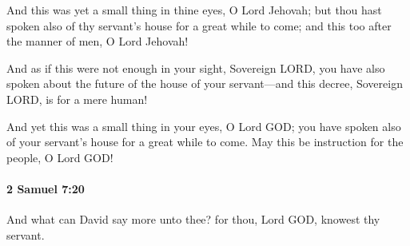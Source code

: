 			\begin{versebox}
					\item[BHS] 
					\item[ASV] And this was yet a small thing in thine eyes, O Lord Jehovah; but thou hast spoken also of thy servant's house for a great while to come; and this too after the manner of men, O Lord Jehovah!
					\item[NIV] And as if this were not enough in your sight, Sovereign LORD, you have also spoken about the future of the house of your servant—and this decree, Sovereign LORD, is for a mere human!
					\item[NRSV] And yet this was a small thing in your eyes, O Lord GOD; you have spoken also of your servant’s house for a great while to come. May this be instruction for the people, O Lord GOD!
			\end{versebox}

		\paragraph{2 Samuel 7:20} %
			\label{2SAMUEL-7-20}

			And what can David say more unto thee? for thou, Lord GOD, knowest thy servant.

